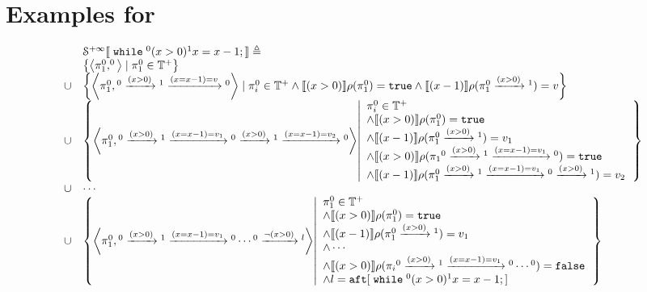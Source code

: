 \section{Examples for \cite{cousot2019abstract}}
\begin{example}
 \[
 \begin{array}{ll}
 & \mathcal{S}^{+\infty}\sem{
 \ewhile {}^0 (x > 0) {}^1 x = x - 1;
 } \triangleq \\
 & \left\{ \left< \pi_1^0, ^0\right> \mid \pi_1^0 \in \mathbb{T^{+}} \right\}
 \\
 \cup & \left\{ \left< \pi_1^0, {}^0 \xrightarrow{(x > 0)} {}^1 \xrightarrow{(x = x - 1) = v} {}^0 \right> 
 \mid \pi_i^0 \in \mathbb{T^{+}} \land 
 \sem{(x > 0)}\env(\pi_1^0) = \etrue  \land
 \sem{(x - 1)}\env(\pi_1^0 \xrightarrow{(x > 0)} {}^1) = v \right\}
 \\
 \cup & \left\{ \left< \pi_1^0, {}^0 \xrightarrow{(x > 0)} {}^1 \xrightarrow{(x = x - 1) = v_1} {}^0 \xrightarrow{(x > 0)} {}^1 \xrightarrow{(x = x - 1) = v_2} {}^0 \right> 
 \left \vert 
 \begin{array}{l}
 \pi_i^0 \in \mathbb{T^{+}} \\
 \land 
 \sem{(x > 0)}\env(\pi_1^0) = \etrue  \\
 \land
 \sem{(x - 1)}\env(\pi_1^0 \xrightarrow{(x > 0)} {}^1) = v_1 \\
 \land 
 \sem{(x > 0)}\env(\pi_1{}^0 \xrightarrow{(x > 0)} {}^1 \xrightarrow{(x = x - 1) = v_1} {}^0) = \etrue \\
 \land
 \sem{(x - 1)}\env(\pi_1^0 \xrightarrow{(x > 0)} {}^1 \xrightarrow{(x = x - 1) = v_1} {}^0 \xrightarrow{(x > 0)} {}^1) = v_2
 \end{array}
 \right.
 \right\}
 \\
 \cup & \cdots 
 \\
 \cup & \left\{ \left< \pi_1^0, {}^0 \xrightarrow{(x > 0)} {}^1\xrightarrow{(x = x - 1) = v_1} {}^0 \cdots  {}^0 \xrightarrow{\neg(x > 0)} {}^l \right>  
 \left \vert 
 \begin{array}{l}
 \pi_1^0 \in \mathbb{T^{+}}\\
 \land 
 \sem{(x > 0)}\env(\pi_1^0) = \etrue  \\
 \land
 \sem{(x - 1)}\env(\pi_1^0 \xrightarrow{(x > 0)} {}^1) = v_1 \\
 \land \cdots \\
 \land 
 \sem{(x > 0)}\env(\pi_i{}^0 \xrightarrow{(x > 0)} {}^1\xrightarrow{(x = x - 1) = v_1} {}^0 \cdots  {}^0) = \efalse \\
 \land l = \kw{aft}[\ewhile {}^0 (x > 0) {}^1 x = x - 1;]
 \end{array}
 \right.
 \right\}
 \end{array}
 \]
 \end{example}
